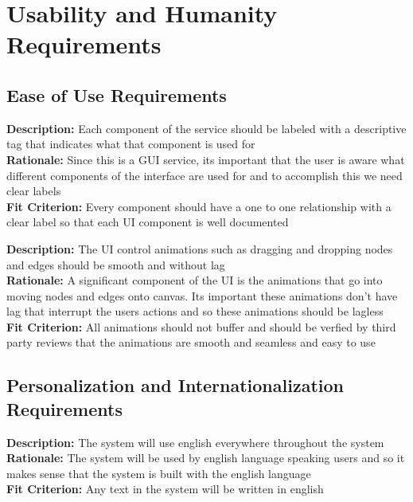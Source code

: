 \documentclass[12pt]{article}
\begin{document}
\vspace{0.5cm}

\section{Usability and Humanity Requirements}
\subsection{Ease of Use Requirements}
\begin{tcolorbox}[title=UHE1]
  \textbf{Description:} Each component of the service should be labeled with a descriptive tag that indicates what that component is used for \\
  \textbf{Rationale:} Since this is a GUI service, its important that the user is aware what different components of the interface are used for and to accomplish this we need clear labels \\
  \textbf{Fit Criterion:} Every component should have a one to one relationship with a clear label so that each UI component is well documented
\end{tcolorbox}
\begin{tcolorbox}[title=UHE2]
  \textbf{Description:} The UI control animations such as dragging and dropping nodes and edges should be smooth and without lag \\
  \textbf{Rationale:} A significant component of the UI is the animations that go into moving nodes and edges onto canvas. Its important these animations don't have lag that interrupt the users actions and so these animations should be lagless \\
  \textbf{Fit Criterion:} All animations should not buffer and should be verfied by third party reviews that the animations are smooth and seamless and easy to use 
\end{tcolorbox}
\subsection{Personalization and Internationalization Requirements}
\begin{tcolorbox}[title=UHPI1]
  \textbf{Description:} The system will use english everywhere throughout the system \\
  \textbf{Rationale:} The system will be used by english language speaking users and so it makes sense that the system is built with the english language\\
  \textbf{Fit Criterion:} Any text in the system will be written in english
\end{tcolorbox}
\end{document}
